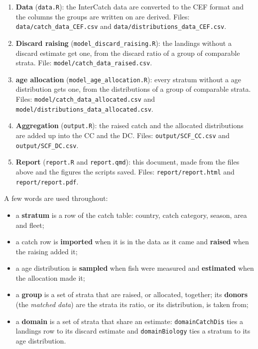 \documentclass[
  a4paper,
  DIV=11,
  numbers=noendperiod]{scrartcl}
\providecommand{\tightlist}{%
  \setlength{\itemsep}{0pt}\setlength{\parskip}{0pt}}
\begin{document}
\begin{enumerate}
\def\labelenumi{\arabic{enumi}.}
\tightlist
\item
  \textbf{Data} (\texttt{data.R}): the InterCatch data are converted to
  the CEF format and the columns the groups are written on are derived.
  Files: \texttt{data/catch\_data\_CEF.csv} and
  \texttt{data/distributions\_data\_CEF.csv}.
\item
  \textbf{Discard raising} (\texttt{model\_discard\_raising.R}): the
  landings without a discard estimate get one, from the discard ratio of
  a group of comparable strata. File:
  \texttt{model/catch\_data\_raised.csv}.
\item
  \textbf{age allocation} (\texttt{model\_age\_allocation.R}): every
  stratum without a age distribution gets one, from the distributions of
  a group of comparable strata. Files:
  \texttt{model/catch\_data\_allocated.csv} and
  \texttt{model/distributions\_data\_allocated.csv}.
\item
  \textbf{Aggregation} (\texttt{output.R}): the raised catch and the
  allocated distributions are added up into the CC and the DC. Files:
  \texttt{output/SCF\_CC.csv} and \texttt{output/SCF\_DC.csv}.
\item
  \textbf{Report} (\texttt{report.R} and \texttt{report.qmd}): this
  document, made from the files above and the figures the scripts saved.
  Files: \texttt{report/report.html} and \texttt{report/report.pdf}.
\end{enumerate}

A few words are used throughout:

\begin{itemize}
\tightlist
\item
  a \textbf{stratum} is a row of the catch table: country, catch
  category, season, area and fleet;
\item
  a catch row is \textbf{imported} when it is in the data as it came and
  \textbf{raised} when the raising added it;
\item
  a age distribution is \textbf{sampled} when fish were measured and
  \textbf{estimated} when the allocation made it;
\item
  a \textbf{group} is a set of strata that are raised, or allocated,
  together; its \textbf{donors} (the \emph{matched data}) are the strata
  its ratio, or its distribution, is taken from;
\item
  a \textbf{domain} is a set of strata that share an estimate:
  \texttt{domainCatchDis} ties a landings row to its discard estimate
  and \texttt{domainBiology} ties a stratum to its age distribution.
\end{itemize}
\end{document}
